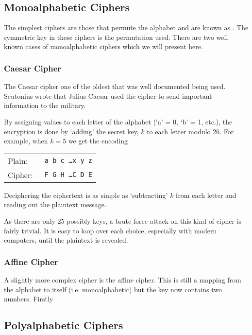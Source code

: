 \subsection{Monoalphabetic Ciphers}

The simplest ciphers are those that permute the alphabet and are known as . The symmetric key in these 	ciphers is the permutation used. There are two well known cases of monoalphabetic ciphers which we will present here. 

\subsubsection*{Caesar Cipher}

The Caesar cipher one of the oldest that was well documented being used. Seutonius wrote that Julius Caesar used the cipher to send important information to the military. 

By assigning values to each letter of the alphabet (`a' = 0, `b' = 1, etc.), the encryption is done by `adding' the secret key, $k$ to each letter modulo 26. For example, when $k = 5$ we get the encoding

\begin{center}
\begin{tabular}{l l}%
	Plain:  &\quad\texttt{ a b c \ldots x y z} \\ 
	Cipher: &\quad\texttt{ F G H \ldots C D E} \\
\end{tabular}
\end{center}

Deciphering the ciphertext is as simple as `subtracting' $k$ from each letter and reading out the plaintext message.

As there are only 25 possibly keys, a brute force attack on this kind of cipher is fairly trivial. It is easy to loop over each choice, especially with modern computers, until the plaintext is revealed.

\subsubsection*{Affine Cipher}

A slightly more complex cipher is the affine cipher. This is still a mapping from the alphabet to itself (i.e. monoalphabetic) but the key now contains two numbers. Firstly

\subsection{Polyalphabetic Ciphers}



